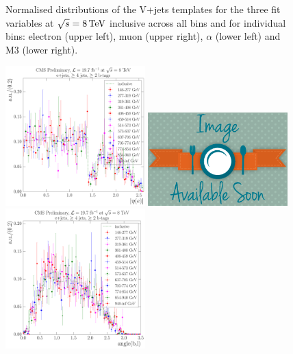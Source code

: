 \begin{figure}[hbtp]
	 \caption{Normalised distributions of the V+jets templates for the three fit variables at $\sqrt{s}=8\,\text{Te\hspace{-.08em}V}$
	 inclusive across all \HT bins and for individual \HT bins: electron \abseta (upper
	 left), muon \abseta (upper right), $\alpha$ (lower left) and M3 (lower right).}
     \label{fig:HT_fit_variable_vjets_comparisons_8TeV}
\end{figure}

\begin{figure}[hbtp]
    \centering
     \includegraphics[width=0.48\textwidth]{Chapters/04_Analysis/04b_XSections/images/8TeV/fit_variables/ST/electron_absolute_eta/vjets/ST_electron_absolute_eta_2orMoreBtags_VJets_template_comparison.pdf}\hfill
     \includegraphics[width=0.48\textwidth]{Chapters/04_Analysis/04b_XSections/images/placeholder.png}\\
     \includegraphics[width=0.48\textwidth]{Chapters/04_Analysis/04b_XSections/images/8TeV/fit_variables/ST/angle_bl/vjets/ST_angle_bl_2orMoreBtags_VJets_template_comparison.pdf}\hfill

\end{figure}
